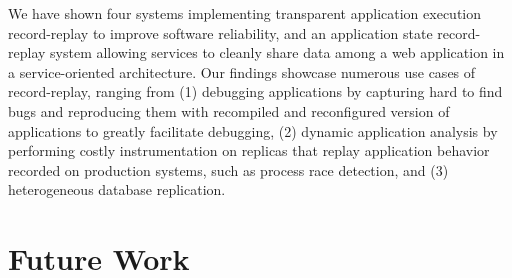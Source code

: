 We have shown four systems implementing transparent application execution
record-replay to improve software reliability, and an application state
record-replay system allowing services to cleanly share data among a web
application in a service-oriented architecture. Our findings showcase numerous
use cases of record-replay, ranging from (1) debugging applications by capturing
hard to find bugs and reproducing them with recompiled and reconfigured version
of applications to greatly facilitate debugging, (2) dynamic application
analysis by performing costly instrumentation on replicas that replay
application behavior recorded on production systems, such as process race
detection, and (3) heterogeneous database replication.

\section{Future Work}

